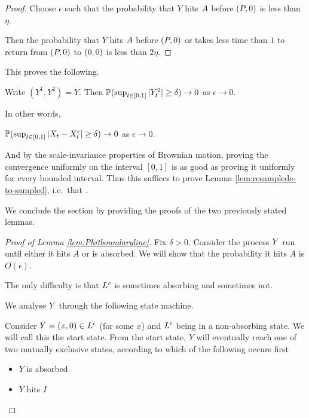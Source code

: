 {\begin{proof}
  Choose $\epsilon$ such that the probability that $Y$ hits
  $\boundarylines$ before $\farpoint$ is less than $\eta$.

  Then the probability that $Y$ hits $\boundarylines$ before $\farpoint$
  or takes less time than $1$ to return from $\farpoint$ to $\origin$ is
  less than $2\eta$.
\end{proof}

This proves the following.

\begin{lemma}
  Write $(Y^1, Y^2) = Y$.  Then $\P(\sup_{t \in [0,1]} |Y^2_t| \ge
  \delta) \to 0$ as $\epsilon \to 0$.
\end{lemma}

In other words,

\begin{cor}
  $\P(\sup_{t \in [0,1]} |\sampled_t - \resamplede_t | \ge \delta) \to
  0$ as $\epsilon \to 0$.
\end{cor}

And by the scale-invariance properties of Brownian motion, proving the
convergence uniformly on the interval $[0,1]$ is as good as proving it
uniformly for every bounded interval.  Thus this suffices to prove
Lemma \ref{lem:resamplede-to-sampled}\label{proof-of-lem:resamplede-to-sampled}, i.e.\ that \statementoflemresampledetosampled.

We conclude the section by providing the proofs of the two previously
stated lemmas.

\begin{proof}[Proof of Lemma \ref{lem:Phitboundaryline}]
Fix $\delta > 0$.  Consider the process $\rotproc$ run until either
it hits $A$ or is absorbed.  We will show that the probability it
hits $A$ is $O(\epsilon)$.

The only difficulty is that $\Le$ is sometimes absorbing and
sometimes not.

We analyse $\rotproc$ through the following state machine.

Consider $\rotproc = (x,0) \in \Le$ (for some $x$) and $\Le$ being in
a non-absorbing state.  We will call this the start state.  From the
start state, $Y$ will eventually reach one of two mutually exclusive
states, according to which of the following occurs first

\newcommand{\intermediatelines}{I}

\begin{itemize}
\item $Y$ is absorbed
\item $Y$ hits $\intermediatelines$
\end{itemize}


\end{proof}}
